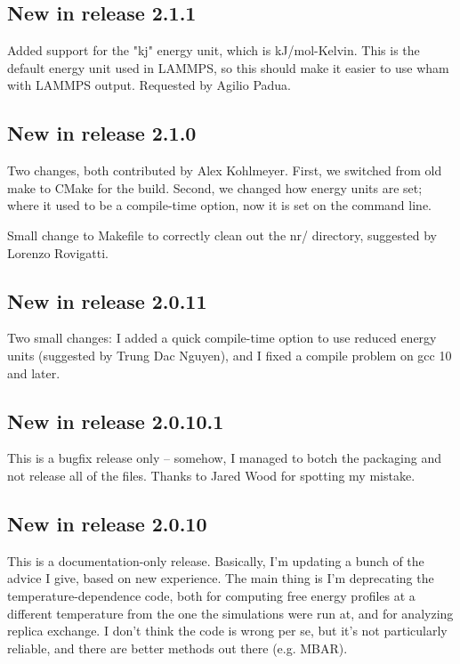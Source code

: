 \documentclass[12pt]{article}
\begin{document}
\subsection{New in release 2.1.1}
Added support for the "kj" energy unit, which is kJ/mol-Kelvin.  This is the
default energy unit used in LAMMPS, so this should make it easier to use wham
with LAMMPS output.  Requested by Agilio Padua.

\subsection{New in release 2.1.0}
Two changes, both contributed by Alex Kohlmeyer. First, we switched from old
make to CMake for the build. Second, we changed how energy units are set; where
it used to be a compile-time option, now it is set on the command line.

Small change to Makefile to correctly clean out the nr/ directory, suggested by
Lorenzo Rovigatti.

\subsection{New in release 2.0.11}

Two small changes: I added a quick compile-time option to use reduced energy units (suggested by Trung Dac Nguyen), and I fixed a compile problem on gcc 10 and later.

\subsection{New in release 2.0.10.1}

This is a bugfix release only -- somehow, I managed to botch the packaging
and not release all of the files. Thanks to Jared Wood for spotting my
mistake.

\subsection{New in release 2.0.10}

This is a documentation-only release. Basically, I'm updating a bunch of the advice I give, based on new experience. The main thing is I'm deprecating the temperature-dependence code, both for computing free energy profiles at a different temperature from the one the simulations were run at, and for analyzing replica exchange. I don't think the code is wrong per se, but it's not particularly reliable, and there are better methods out there (e.g. MBAR).
\end{document}
